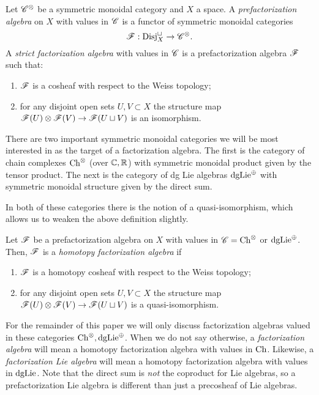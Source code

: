 \documentclass[10pt]{amsart}
\begin{document}
\begin{dfn} 
Let $\mathscr C^{\otimes}$ be a symmetric monoidal category and $X$ a space.
A {\em prefactorization algebra} on $X$ with values in $\mathscr C$ is a functor of symmetric monoidal categories
\[
\mathscr F : {\rm Disj}^{\sqcup}_X \to \mathscr C^\otimes .
\]
A {\em strict factorization algebra} with values in $\mathscr C$ is a prefactorization algebra $\mathscr F$ such that: 
\begin{enumerate}
\item $\mathscr F$ is a cosheaf with respect to the Weiss topology;
\item for any disjoint open sets $U, V \subset X$ the structure map $\mathscr F(U) \otimes \mathscr F(V) \to \mathscr F(U \sqcup V)$ is an isomorphism.
\end{enumerate}
\end{dfn}

There are two important symmetric monoidal categories we will be most interested in as the target of a factorization algebra.
The first is the category of chain complexes ${\rm Ch}^{\otimes}$ (over $\mathbb C, \mathbb R$) with symmetric monoidal product given by the tensor product.
The next is the category of dg Lie algebras ${\rm dgLie}^{\oplus}$ with symmetric monoidal structure given by the direct sum.

In both of these categories there is the notion of a quasi-isomorphism, which allows us to weaken the above definition slightly.  

\begin{dfn} 
Let $\mathscr F$ be a prefactorization algebra on $X$ with values in $\mathscr C = {\rm Ch}^{\otimes}$ or ${\rm dgLie}^{\oplus}$. 
Then, $\mathscr F$ is a {\em homotopy factorization algebra} if
\begin{enumerate}
\item $\mathscr F$ is a homotopy cosheaf with respect to the Weiss topology;
\item for any disjoint open sets $U, V \subset X$ the structure map $\mathscr F(U) \otimes \mathscr F(V) \to \mathscr F(U \sqcup V)$ is a quasi-isomorphism.
\end{enumerate}
\end{dfn}


For the remainder of this paper we will only discuss factorization algebras valued in these categories ${\rm Ch}^\otimes, {\rm dgLie}^{\oplus}$.
When we do not say otherwise, a {\em factorization algebra} will mean a homotopy factorization algebra with values in ${\rm Ch}$. 
Likewise, a {\em factorization Lie algebra} will mean a homotopy factorization algebra with values in ${\rm dgLie}$. 
Note that the direct sum is {\em not} the coproduct for Lie algebras, so a prefactorization Lie algebra is different than just a precosheaf of Lie algebras. 
\end{document}
